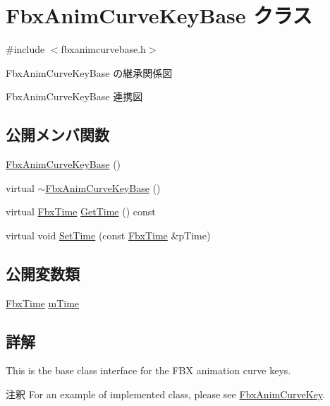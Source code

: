 \hypertarget{class_fbx_anim_curve_key_base}{}\section{Fbx\+Anim\+Curve\+Key\+Base クラス}
\label{class_fbx_anim_curve_key_base}


{\ttfamily \#include $<$fbxanimcurvebase.\+h$>$}



Fbx\+Anim\+Curve\+Key\+Base の継承関係図


Fbx\+Anim\+Curve\+Key\+Base 連携図
\subsection*{公開メンバ関数}
\begin{DoxyCompactItemize}
\item 
\hyperlink{class_fbx_anim_curve_key_base_a76d982fc9fe4888f2db2e8d4bb5d4f2f}{Fbx\+Anim\+Curve\+Key\+Base} ()
\item 
virtual \hyperlink{class_fbx_anim_curve_key_base_a2f773ce4bba07ee0f92f9cb9b5f3233b}{$\sim$\+Fbx\+Anim\+Curve\+Key\+Base} ()
\item 
virtual \hyperlink{class_fbx_time}{Fbx\+Time} \hyperlink{class_fbx_anim_curve_key_base_a3eebfd7bd2101f759269373a6c9343a2}{Get\+Time} () const
\item 
virtual void \hyperlink{class_fbx_anim_curve_key_base_a1c8d15159d7b00280411c08f86c951ca}{Set\+Time} (const \hyperlink{class_fbx_time}{Fbx\+Time} \&p\+Time)
\end{DoxyCompactItemize}
\subsection*{公開変数類}
\begin{DoxyCompactItemize}
\item 
\hyperlink{class_fbx_time}{Fbx\+Time} \hyperlink{class_fbx_anim_curve_key_base_a8b62f6694176ae418ed4cb936f52545a}{m\+Time}
\end{DoxyCompactItemize}


\subsection{詳解}
This is the base class interface for the F\+BX animation curve keys.

\begin{DoxyRemark}{注釈}
For an example of implemented class, please see \hyperlink{class_fbx_anim_curve_key}{Fbx\+Anim\+Curve\+Key}. 
\end{DoxyRemark}


